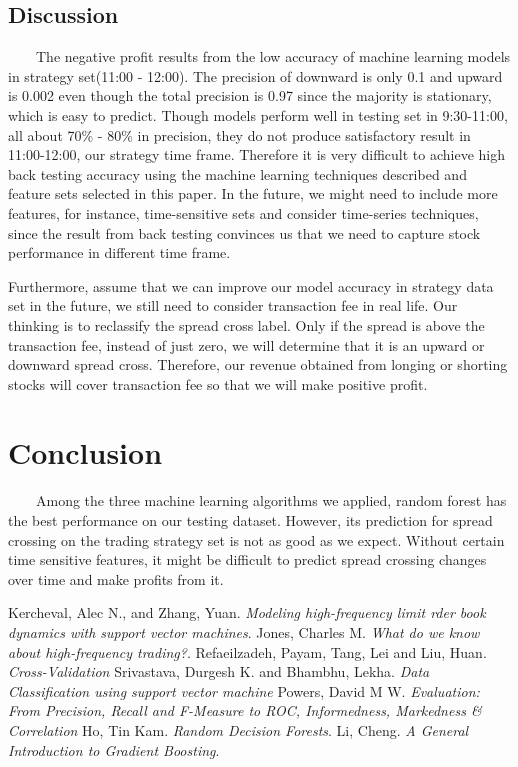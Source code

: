\documentclass[11pt]{article}
\begin{document}
\subsection{Discussion}
\ \ \ \ The negative profit results from the low accuracy of machine learning models in strategy set(11:00 - 12:00). The precision of downward is only 0.1 and upward is 0.002 even though the total precision is 0.97 since the majority is stationary, which is easy to predict. Though models perform well in testing set in 9:30-11:00, all about 70\% - 80\% in precision, they do not produce satisfactory result in 11:00-12:00, our strategy time frame. Therefore it is very difficult to achieve high back testing accuracy using the machine learning techniques described and feature sets selected in this paper. In the future, we might need to include more features, for instance, time-sensitive sets and consider time-series techniques, since the result from back testing convinces us that we need to capture stock performance in different time frame.
\par 
Furthermore, assume that we can improve our model accuracy in strategy data set in the future, we still need to consider transaction fee in real life. Our thinking is to reclassify the spread cross label. Only if the spread is above the transaction fee, instead of just zero, we will determine that it is an upward or downward spread cross. Therefore, our revenue obtained from longing or shorting stocks will cover transaction fee so that we will make positive profit.


\section{Conclusion}
\ \ \ \ Among the three machine learning algorithms we applied, random forest has the best performance on our testing dataset. However, its prediction for spread crossing on the trading strategy set is not as good as we expect. Without certain time sensitive features, it might be difficult to predict spread crossing changes over time and make profits from it.


\begin{thebibliography}{1}
Kercheval, Alec N., and Zhang, Yuan.
\textit{Modeling high-frequency limit rder book dynamics with
support vector machines}. 
Jones, Charles M. 
\textit{What do we know about high-frequency trading?}.
Refaeilzadeh, Payam, Tang, Lei and Liu, Huan.
\textit{Cross-Validation}
Srivastava, Durgesh K. and Bhambhu, Lekha.
\textit{Data Classification using support vector machine}
Powers, David M W.
\textit{Evaluation: From Precision, Recall and F-Measure to ROC, Informedness, Markedness \& Correlation}
Ho, Tin Kam.
\textit{Random Decision Forests}.
Li, Cheng.
\textit{A General Introduction to Gradient Boosting}.
\end{thebibliography}
\end{document}
